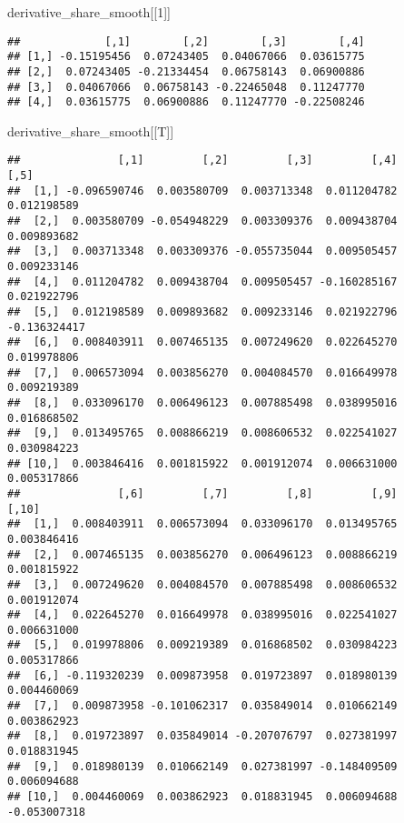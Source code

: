 \documentclass[
]{book}
\newenvironment{Shaded}{\begin{snugshade}}{\end{snugshade}}
\newcommand{\DecValTok}[1]{\textcolor[rgb]{0.00,0.00,0.81}{#1}}
\newcommand{\NormalTok}[1]{#1}
\begin{document}
\begin{Shaded}
\begin{Highlighting}[]
\NormalTok{derivative\_share\_smooth[[}\DecValTok{1}\NormalTok{]]}
\end{Highlighting}
\end{Shaded}

\begin{verbatim}
##             [,1]        [,2]        [,3]        [,4]
## [1,] -0.15195456  0.07243405  0.04067066  0.03615775
## [2,]  0.07243405 -0.21334454  0.06758143  0.06900886
## [3,]  0.04067066  0.06758143 -0.22465048  0.11247770
## [4,]  0.03615775  0.06900886  0.11247770 -0.22508246
\end{verbatim}

\begin{Shaded}
\begin{Highlighting}[]
\NormalTok{derivative\_share\_smooth[[T]]}
\end{Highlighting}
\end{Shaded}

\begin{verbatim}
##               [,1]         [,2]         [,3]         [,4]         [,5]
##  [1,] -0.096590746  0.003580709  0.003713348  0.011204782  0.012198589
##  [2,]  0.003580709 -0.054948229  0.003309376  0.009438704  0.009893682
##  [3,]  0.003713348  0.003309376 -0.055735044  0.009505457  0.009233146
##  [4,]  0.011204782  0.009438704  0.009505457 -0.160285167  0.021922796
##  [5,]  0.012198589  0.009893682  0.009233146  0.021922796 -0.136324417
##  [6,]  0.008403911  0.007465135  0.007249620  0.022645270  0.019978806
##  [7,]  0.006573094  0.003856270  0.004084570  0.016649978  0.009219389
##  [8,]  0.033096170  0.006496123  0.007885498  0.038995016  0.016868502
##  [9,]  0.013495765  0.008866219  0.008606532  0.022541027  0.030984223
## [10,]  0.003846416  0.001815922  0.001912074  0.006631000  0.005317866
##               [,6]         [,7]         [,8]         [,9]        [,10]
##  [1,]  0.008403911  0.006573094  0.033096170  0.013495765  0.003846416
##  [2,]  0.007465135  0.003856270  0.006496123  0.008866219  0.001815922
##  [3,]  0.007249620  0.004084570  0.007885498  0.008606532  0.001912074
##  [4,]  0.022645270  0.016649978  0.038995016  0.022541027  0.006631000
##  [5,]  0.019978806  0.009219389  0.016868502  0.030984223  0.005317866
##  [6,] -0.119320239  0.009873958  0.019723897  0.018980139  0.004460069
##  [7,]  0.009873958 -0.101062317  0.035849014  0.010662149  0.003862923
##  [8,]  0.019723897  0.035849014 -0.207076797  0.027381997  0.018831945
##  [9,]  0.018980139  0.010662149  0.027381997 -0.148409509  0.006094688
## [10,]  0.004460069  0.003862923  0.018831945  0.006094688 -0.053007318
\end{verbatim}
\end{document}
